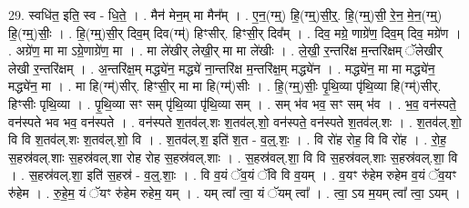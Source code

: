 \documentclass[17pt]{extarticle}
\begin{document}
29. स्वधि॑त॒ इति॒ स्व - धि॒ते॒ । . मैन॑ मेन॒म् मा मैन᳚म् । . ए॒न॒(ग्म्॒) हि॒(ग्म्॒)सी॒र्॒. हि॒(ग्म्॒)सी॒ रे॒न॒ मे॒न॒(ग्म्॒) हि॒(ग्म्॒)सीः॒ । . हि॒(ग्म्॒)सी॒र् दिव॒म् दिव(ग्म्॑) हिꣳसीर्. हिꣳसी॒र् दिव᳚म् । . दिव॒ मग्रे॒ णाग्रे॑ण॒ दिव॒म् दिव॒ मग्रे॑ण । . अग्रे॑ण॒ मा मा ऽग्रे॒णाग्रे॑ण॒ मा । . मा ले॑खीर् लेखी॒र् मा मा ले॑खीः । . ले॒खी॒ र॒न्तरि॑क्ष म॒न्तरि॑क्षम् ॅलेखीर् लेखी र॒न्तरि॑क्षम् । . अ॒न्तरि॑क्ष॒म् मद्ध्ये॑न॒ मद्ध्ये॑ ना॒न्तरि॑क्ष म॒न्तरि॑क्ष॒म् मद्ध्ये॑न । . मद्ध्ये॑न॒ मा मा मद्ध्ये॑न॒ मद्ध्ये॑न॒ मा । . मा हि(ग्म्॑)सीर्. हिꣳसी॒र् मा मा हि(ग्म्॑)सीः । . हि॒(ग्म्॒)सीः॒ पृ॒थि॒व्या पृ॑थि॒व्या हि(ग्म्॑)सीर्. हिꣳसीः पृथि॒व्या । . पृ॒थि॒व्या सꣳ सम् पृ॑थि॒व्या पृ॑थि॒व्या सम् । . सम् भ॑व भव॒ सꣳ सम् भ॑व । . भ॒व॒ वन॑स्पते॒ वन॑स्पते भव भव॒ वन॑स्पते । . वन॑स्पते श॒तव॑ल्.शः श॒तव॑ल्.शो॒ वन॑स्पते॒ वन॑स्पते श॒तव॑ल्.शः । . श॒तव॑ल्.शो॒ वि वि श॒तव॑ल्.शः श॒तव॑ल्.शो॒ वि । . श॒तव॑ल्.श॒ इति॑ श॒त - व॒ल्॒.शः॒ । . वि रो॑ह रोह॒ वि वि रो॑ह । . रो॒ह॒ स॒हस्र॑वल्.शाः स॒हस्र॑वल्.शा रोह रोह स॒हस्र॑वल्.शाः । . स॒हस्र॑वल्.शा॒ वि वि स॒हस्र॑वल्.शाः स॒हस्र॑वल्.शा॒ वि । . स॒हस्र॑वल्.शा॒ इति॑ स॒हस्र॑ - व॒ल्॒.शाः॒ । . वि व॒यं ॅव॒यं ॅवि वि व॒यम् । . व॒यꣳ रु॑हेम रुहेम व॒यं ॅव॒यꣳ रु॑हेम । . रु॒हे॒म॒ यं ॅयꣳ रु॑हेम रुहेम॒ यम् । . यम् त्वा᳚ त्वा॒ यं ॅयम् त्वा᳚ । . त्वा॒ ऽय म॒यम् त्वा᳚ त्वा॒ ऽयम् । \newline
\end{document}
